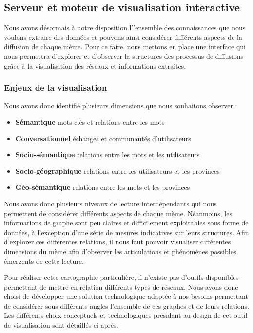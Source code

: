 \subsection{Serveur et moteur de visualisation interactive}

Nous avons désormais à notre disposition l'{\textquoteright}ensemble des connaissances que nous voulons extraire des données et pouvons ainsi considérer différents aspects de la diffusion de chaque  mème. Pour ce faire, nous mettons en place une interface qui nous permettra d'explorer et d'observer la structures des processus de diffusions grâce à la visualisation des réseaux et informations extraites.

\subsubsection{Enjeux de la visualisation} %
\label{ssub:enjeux_de_la_visualisation}

Nous avons donc identifié plusieurs dimensions que nous souhaitons observer :

\begin{itemize}
    \item \textbf{Sémantique} mots-clés et relations entre les mots
    \item \textbf{Conversationnel} échanges et communautés d{\textquoteright}utilisateurs 
    \item \textbf{Socio-sémantique} relations entre les mots et les utilisateurs
    \item \textbf{Socio-géographique} relations entre les utilisateurs et les provinces
    \item \textbf{Géo-sémantique} relations entre les mots et les provinces
\end{itemize}


Nous avons donc plusieurs niveaux de lecture interdépendants qui nous permettent de considérer différents aspects de chaque mème. Néanmoins, les informations de graphe sont peu claires et difficilement exploitables sous forme de données, à l{\textquoteright}exception d{\textquoteright}une série de mesures indicatives sur leurs structures. Afin d{\textquoteright}explorer ces différentes relations, il nous faut pouvoir visualiser différentes dimensions du mème afin d{\textquoteright}observer les articulations et phénomènes possibles émergents de cette lecture. 

Pour réaliser cette cartographie particulière, il n{\textquoteright}existe pas d{\textquoteright}outils disponibles permettant de mettre en relation différents types de réseaux. Nous avons donc choisi de développer une solution technologique adaptée à nos besoins permettant de considérer sous différents angles l{\textquoteright}ensemble de ces graphes et de leurs relations. Les différents choix conceptuels et technologiques présidant au design de cet outil de visualisation sont détaillés ci-après. 

